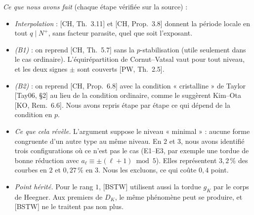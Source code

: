 \documentclass[11pt]{amsart}
\begin{document}
\emph{Ce que nous avons fait} (chaque étape vérifiée sur la source) :
\begin{itemize}
\item \emph{Interpolation} : [CH, Th.~3.11] et [CH, Prop.~3.8] donnent la période locale en tout $q\mid N^+$, sans facteur parasite, quel que soit l'exposant.
\item \emph{(B1)} : on reprend [CH, Th.~5.7] sans la $p$-stabilisation (utile seulement dans le cas ordinaire). L'équirépartition de Cornut--Vatsal vaut pour tout niveau, et les deux signes $\pm$ sont couverts [PW, Th.~2.5].
\item \emph{(B2)} : on reprend [CH, Prop.~6.8] avec la condition « cristalline » de Taylor [Tay06, \S2] au lieu de la condition ordinaire, comme le suggèrent Kim--Ota [KO, Rem.~6.6]. Nous avons repris étape par étape ce qui dépend de la condition en $p$.
\item \emph{Ce que cela révèle.} L'argument suppose le niveau « minimal » : aucune forme congruente d'un autre type au même niveau. En $2$ et $3$, nous avons identifié trois configurations où ce n'est pas le cas (E1--E3, par exemple une tordue de bonne réduction avec $a_\ell\equiv\pm(\ell+1)\bmod5$). Elles représentent $3{,}2\,\%$ des courbes en $2$ et $0{,}27\,\%$ en $3$. Nous les excluons, ce qui coûte $0{,}4$ point.
\item \emph{Point hérité.} Pour le rang $1$, [BSTW] utilisent aussi la tordue $g_K$ par le corps de Heegner. Aux premiers de $D_K$, le même phénomène peut se produire, et [BSTW] ne le traitent pas non plus.
\end{itemize}
\end{document}
